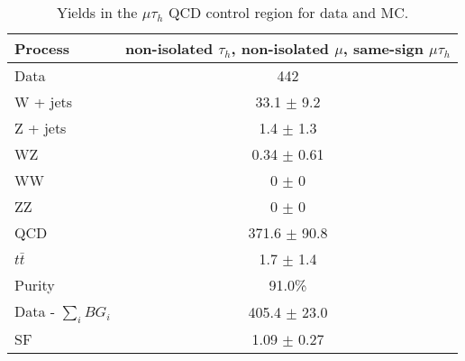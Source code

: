 \begin{table}[htbp!]
\begin{center}
 \caption{ Yields in the $\mu\tau_{h}$ QCD control region for data and MC.}
 \begin{tabular}{| l | c |}
 \hline\hline
Process & non-isolated $\tau_{h}$, non-isolated $\mu$, same-sign $\mu\tau_{h}$ \\ \hline
Data & 442 \\
W + jets & 33.1 $\pm$ 9.2 \\
Z + jets & 1.4 $\pm$ 1.3 \\
WZ & 0.34 $\pm$ 0.61 \\
WW & 0 $\pm$ 0 \\
ZZ & 0 $\pm$ 0 \\
QCD & 371.6 $\pm$ 90.8 \\
$t\bar{t}$ & 1.7 $\pm$ 1.4 \\ \hline
Purity & 91.0\% \\
Data - $\sum\limits_{i} BG_{i}$ & 405.4 $\pm$ 23.0 \\ \hline
SF & 1.09 $\pm$ 0.27 \\
 \hline
 \hline
 \end{tabular}
 \label{table:theQCDMuTauControlTable}
\end{center}
\end{table}

